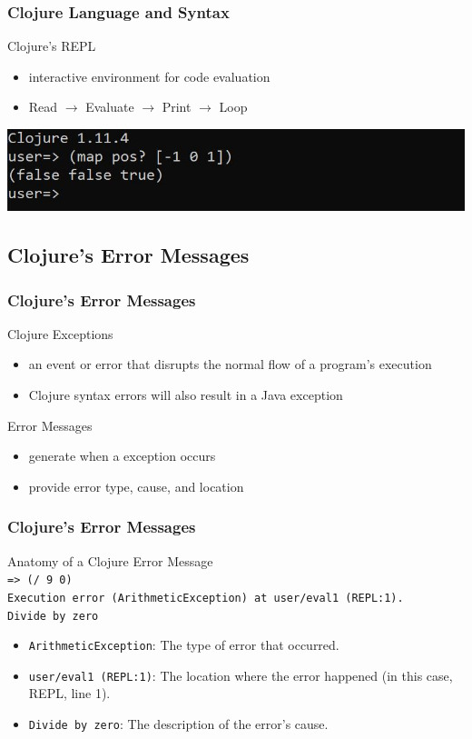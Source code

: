 \documentclass{beamer}
\newcommand{\comment}[1]{{\bf \tt  {#1}}}
\newcommand{\emcomment}[1]{\textcolor{ForestGreen}{\comment{Elena: {#1}}}}
\begin{document}
\begin{frame}
  \frametitle{Clojure Language and Syntax}
  Clojure's REPL
  \begin{itemize}
    \item interactive environment for code evaluation
    \item Read \(\rightarrow\) Evaluate \(\rightarrow\) Print \(\rightarrow\) Loop
  \end{itemize}
  \includegraphics{../resources/cljScreenshot.JPG}  
\end{frame}

\subsection{Clojure's Error Messages}
\begin{frame}
  \frametitle{Clojure's Error Messages}
  Clojure Exceptions
  \begin{itemize}
    \item an event or error that disrupts the normal flow of a program's execution
    \item Clojure syntax errors will also result in a Java exception %
  \end{itemize}
  Error Messages
  \begin{itemize}
    \item generate when a exception occurs
    \item provide error type, cause, and location
  \end{itemize}
\end{frame}

\begin{frame}
    \frametitle{Clojure's Error Messages}
    Anatomy of a Clojure Error Message \\
    \texttt{=> (/ 9 0)} \\
    \texttt{Execution error (ArithmeticException) at user/eval1 (REPL:1).} \\
    \texttt{Divide by zero}
    \begin{itemize}
      \item \texttt{ArithmeticException}: The type of error that occurred.
      \item \texttt{user/eval1 (REPL:1)}: The location where the error happened (in this case, REPL, line 1).
      \item \texttt{Divide by zero}: The description of the error's cause.
    \end{itemize}
\end{frame}
\end{document}
